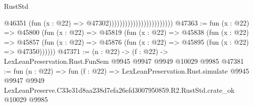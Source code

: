 \begin{lexlean}{RustStd}
\begin{coremodule}
                                                @46351
                                                  (fun (x : @22) => @47302))))))))))))))))))))))))
@47363 := fun (x : @22) =>
  @45800
    (fun (x : @22) =>
    @45819
      (fun (x : @22) =>
      @45838
        (fun (x : @22) =>
        @45857 (fun (x : @22) => @45876 (fun (x : @22) => @45895 (fun (x : @22) => @47350))))))
@47371 := (n : @22) -> (f : @22) -> LexLeanPreservation.Rust.FunSem @9945 @9947 @9949 @10029 @9985
@47381 := fun (n : @22) =>
  fun (f : @22) =>
  LexLeanPreservation.Rust.simulate
    @9945
    @9947
    @9949
    LexLeanPreserve.C33e31d8aa238d7efa26efd3007950859.R2.RustStd.crate_ok
    @10029
    @9985
\end{coremodule}
\end{lexlean}
